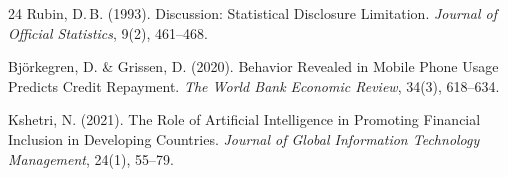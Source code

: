 \documentclass[12pt, a4paper, twocolumn]{article}
\begin{document}
\begin{thebibliography}{24}
Rubin, D.\,B. (1993).
\newblock Discussion: Statistical Disclosure Limitation.
\newblock \textit{Journal of Official Statistics}, 9(2), 461--468.

Bj\"orkegren, D. \& Grissen, D. (2020).
\newblock Behavior Revealed in Mobile Phone Usage Predicts Credit Repayment.
\newblock \textit{The World Bank Economic Review}, 34(3), 618--634.

Kshetri, N. (2021).
\newblock The Role of Artificial Intelligence in Promoting Financial Inclusion in Developing Countries.
\newblock \textit{Journal of Global Information Technology Management}, 24(1), 55--79.

\end{thebibliography}

\newpage
\onecolumn
\end{document}
